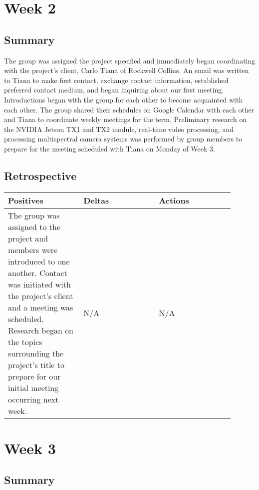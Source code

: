 \documentclass[letterpaper,10pt,serif,draftclsnofoot,onecolumn,compsoc,titlepage]{IEEEtran}
\begin{document}
\section{Week 2}

\subsection{Summary}

The group was assigned the project specified and immediately began coordinating 
with the project's client, Carlo Tiana of Rockwell Collins. 
An email was written to Tiana to make first contact, exchange contact 
information,
established preferred contact medium, and began inquiring about our first meeting.
Introductions began with the group for each other to become acquainted with 
each other. 
The group shared their schedules on Google Calendar with each other and Tiana 
to coordinate weekly meetings for the term. 
Preliminary research on the NVIDIA Jetson TX1 and TX2 module, real-time video 
processing, and processing multispectral camera systems was performed by group members 
to prepare for the meeting scheduled with Tiana on Monday of Week 3. \\


\subsection{Retrospective}

\begin{tabular}{|p{0.3\linewidth}|p{0.3\linewidth}|p{0.3\linewidth}|}
   \hline
   \textbf{Positives} & \textbf{Deltas} & \textbf{Actions}\\ 
   \hline
   The group was assigned to the project and members were introduced to one another. 
   Contact was initiated with the project's client and a meeting was scheduled. 
   Research began on the topics surrounding the project's title to prepare 
   for our initial meeting occurring next week. 
   & 
   N/A 
   & 
   N/A \\
   \hline
\end{tabular}


\section{Week 3}

\subsection{Summary}
\end{document}
